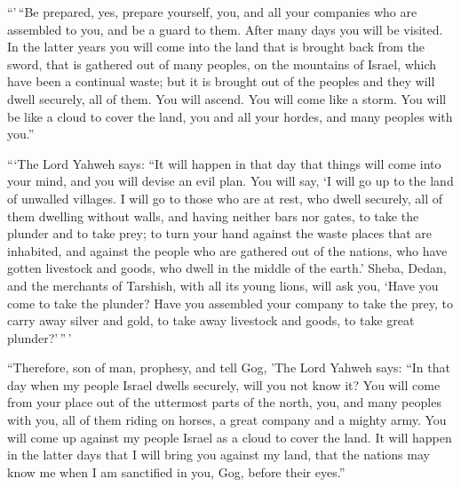  ``'\,``Be prepared, yes, prepare yourself, you, and all
your companies who are assembled to you, and be a guard to them.
 After many days you will be visited. In the latter years
you will come into the land that is brought back from the sword, that is
gathered out of many peoples, on the mountains of Israel, which have
been a continual waste; but it is brought out of the peoples and they
will dwell securely, all of them.  You will ascend. You
will come like a storm. You will be like a cloud to cover the land, you
and all your hordes, and many peoples with you.''

 ```The Lord Yahweh says: ``It will happen in that day
that things will come into your mind, and you will devise an evil plan.
 You will say, `I will go up to the land of unwalled
villages. I will go to those who are at rest, who dwell securely, all of
them dwelling without walls, and having neither bars nor gates,
 to take the plunder and to take prey; to turn your hand
against the waste places that are inhabited, and against the people who
are gathered out of the nations, who have gotten livestock and goods,
who dwell in the middle of the earth.'  Sheba, Dedan, and
the merchants of Tarshish, with all its young lions, will ask you, `Have
you come to take the plunder? Have you assembled your company to take
the prey, to carry away silver and gold, to take away livestock and
goods, to take great plunder?'\,''\,'

 ``Therefore, son of man, prophesy, and tell Gog, 'The
Lord Yahweh says: ``In that day when my people Israel dwells securely,
will you not know it?  You will come from your place out
of the uttermost parts of the north, you, and many peoples with you, all
of them riding on horses, a great company and a mighty army.
 You will come up against my people Israel as a cloud to
cover the land. It will happen in the latter days that I will bring you
against my land, that the nations may know me when I am sanctified in
you, Gog, before their eyes.''

